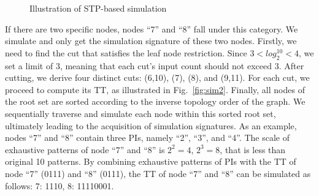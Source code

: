 \documentclass[conference]{IEEEtran}
\begin{document}
\begin{figure}[t]
  \centering  %
  \subfigbottomskip=-4pt %
  \subfigcapskip=-5pt %
      \hspace{15mm}
  \caption{Illustration of STP-based simulation}
  \label{fig:sim}
  \vspace{-2mm}
\end{figure}

If there are two specific nodes, nodes ``7'' and ``8'' fall under this category.
We simulate and only get the simulation signature of these two nodes.
Firstly, we need to find the cut that satisfies the leaf node restriction. 
Since $3 < log_2^{10} < 4$, we set a limit of 3, meaning that each cut's input count should not exceed 3.
After cutting, we derive four distinct cuts: (6,10), (7), (8), and (9,11). 
For each cut, we proceed to compute its TT, as illustrated in Fig.~\ref{fig:sim2}.
Finally, all nodes of the root set are sorted according to the inverse topology order of the graph. 
We sequentially traverse and simulate each node within this sorted root set, ultimately leading to the acquisition of simulation signatures.
As an example, nodes ``7'' and ``8'' contain three PIs, namely ``2'', ``3'', and ``4''.
The scale of exhaustive patterns of node ``7'' and ``8'' is $2^2=4$, $2^3=8$, that is less than original 10 patterns.
By combining exhaustive patterns of PIs with the TT of node ``7'' (0111) and ``8'' (0111), the TT of node ``7'' and ``8'' can be simulated as follows: 7: 1110, 8: 11110001.
\end{document}
